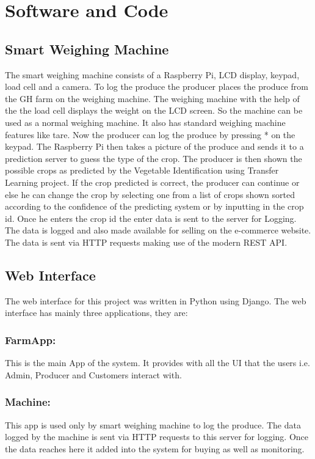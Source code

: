 \documentclass[a4paper,12pt,oneside]{book}
\begin{document}
		\newpage
		
		\section{Software and Code}
		
		\subsection{Smart Weighing Machine}
		The smart weighing machine consists of a Raspberry Pi, LCD display, keypad, load cell and a camera. To log the produce the producer places the produce from the GH farm on the weighing machine. The weighing machine with the help of the the load cell displays the weight on the LCD screen. So the machine can be used as a normal weighing machine. It also has standard weighing machine features like tare. Now the producer can log the produce by pressing * on the keypad. The Raspberry Pi then takes a picture of the produce and sends it to a prediction server to guess the type of the crop. The producer is then shown the possible crops as predicted by the Vegetable Identification using Transfer Learning project. If the crop predicted is correct, the producer can continue or else he can change the crop by selecting one from a list of crops shown sorted according to the confidence of the predicting system or by inputting in the crop id. Once he enters the crop id the enter data is sent to the server for Logging. The data is logged and also made available for selling on the e-commerce website. The data is sent via HTTP requests making use of the modern REST API.
		\subsection{Web Interface}
		The web interface for this project was written in Python using Django. The web interface has mainly three applications, they are:
		\subsubsection{FarmApp:}
		This is the main App of the system. It provides with all the UI that the users i.e. Admin, Producer and Customers interact with.
		\subsubsection{Machine:}
		This app is used only by smart weighing machine to log the produce. The data logged by the machine is sent via HTTP requests to this server for logging. Once the data reaches here it added into the system for buying as well as monitoring.
\end{document}
